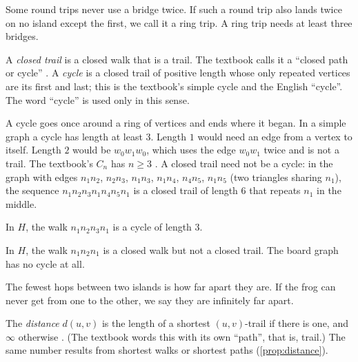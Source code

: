 \plainwords{} Some round trips never use a bridge twice. If such a round trip
also lands twice on no island except the first, we call it a ring trip. A
ring trip needs at least three bridges.

\begin{definition}\label{def:cycle}
A \emph{closed trail} is a closed walk that is a trail. The textbook calls
it a ``closed path or cycle'' \cite[Definition~1.2.14,
p.~22]{petrosyan2015graphs}. A \emph{cycle} is a closed trail of positive
length whose only repeated vertices are its first and last; this is the
textbook's simple cycle \cite[Definition~1.2.15, p.~22]{petrosyan2015graphs}
and the English ``cycle''. The word ``cycle'' is used only in this sense.
\end{definition}

\begin{remark}\label{rem:cycle}
A cycle goes once around a ring of vertices and ends where it began. In a
simple graph a cycle has length at least $3$. Length $1$ would need an
edge from a vertex to itself. Length $2$ would be $w_0w_1w_0$, which uses
the edge $w_0w_1$ twice and is not a trail. The textbook's $C_n$ has
$n\ge 3$ \cite[p.~22]{petrosyan2015graphs}. A closed trail need not be a
cycle: in the graph with edges $n_1n_2$, $n_2n_3$, $n_1n_3$, $n_1n_4$,
$n_4n_5$, $n_1n_5$ (two triangles sharing $n_1$), the sequence
$n_1n_2n_3n_1n_4n_5n_1$ is a closed trail of length $6$ that repeats $n_1$
in the middle.
\end{remark}
\begin{example}
In $H$, the walk $n_1n_2n_3n_1$ is a cycle of length $3$.
\end{example}
\begin{nonexample}
In $H$, the walk $n_1n_2n_1$ is a closed walk but not a closed trail. The
board graph has no cycle at all.
\end{nonexample}

\plainwords{} The fewest hops between two islands is how far apart they
are. If the frog can never get from one to the other, we say they are
infinitely far apart.

\begin{definition}\label{def:distance}
The \emph{distance} $d(u,v)$ is the length of a shortest $(u,v)$-trail if
there is one, and $\infty$ otherwise
\cite[Definition~1.2.16, pp.~22--23]{petrosyan2015graphs}. (The textbook
words this with its own ``path'', that is, trail.) The same number results
from shortest walks or shortest paths (\cref{prop:distance}).
\end{definition}


